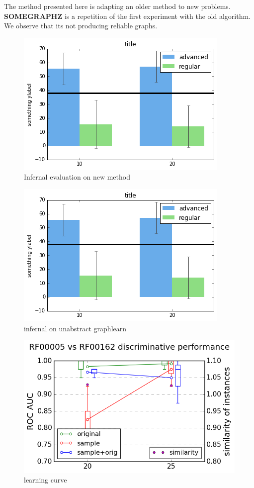 \documentclass{article}
\begin{document}
The method presented here is adapting an older method to new problems.
\textbf{SOMEGRAPHZ} is a repetition of the first experiment with 
the old algorithm. We observe that its not producing reliable
graphs.
\begin{figure}[ht]
      \centering
        \includegraphics[width=0.8\linewidth]{images/infernal_abstr.png}
      \caption{Infernal evaluation on new method}
      \label{alabelb}
\end{figure}
\begin{figure}[ht]
      \centering
        \includegraphics[width=0.8\linewidth]{images/infernal_abstr.png}
      \caption{infernal on unabstract graphlearn}
      \label{alabeld}
\end{figure}
\begin{figure}[ht]
      \centering
        \includegraphics[width=0.8\linewidth]{images/learningcurve.png}
      \caption{learning curve}
      \label{alabelc}
\end{figure}
\end{document}
